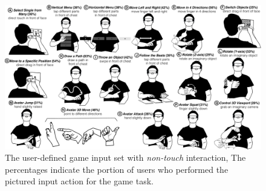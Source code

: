 \documentclass{sigchi}
\begin{document}
  \begin{figure}
  \centering
  \includegraphics[width=1\textwidth]{InAirSet.pdf}
  \caption{The user-defined game input set with \emph{non-touch} interaction, The percentages indicate the portion of users who performed the pictured input action for the game task.}
  \label{fig:InAirSet}
  \end{figure}
\end{document}
